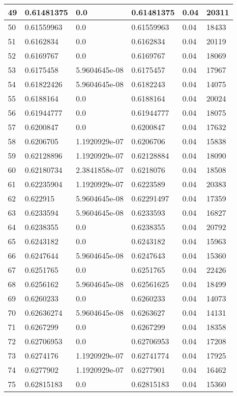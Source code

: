 \begin{longtable}{|l|l|l|l|l|l|}
49 & 0.61481375 & 0.0 & 0.61481375 & 0.04 & 20311 \\ \hline 
50 & 0.61559963 & 0.0 & 0.61559963 & 0.04 & 18433 \\ \hline 
51 & 0.6162834 & 0.0 & 0.6162834 & 0.04 & 20119 \\ \hline 
52 & 0.6169767 & 0.0 & 0.6169767 & 0.04 & 18069 \\ \hline 
53 & 0.6175458 & 5.9604645e-08 & 0.6175457 & 0.04 & 17967 \\ \hline 
54 & 0.61822426 & 5.9604645e-08 & 0.6182243 & 0.04 & 14075 \\ \hline 
55 & 0.6188164 & 0.0 & 0.6188164 & 0.04 & 20024 \\ \hline 
56 & 0.61944777 & 0.0 & 0.61944777 & 0.04 & 18075 \\ \hline 
57 & 0.6200847 & 0.0 & 0.6200847 & 0.04 & 17632 \\ \hline 
58 & 0.6206705 & 1.1920929e-07 & 0.6206706 & 0.04 & 15838 \\ \hline 
59 & 0.62128896 & 1.1920929e-07 & 0.62128884 & 0.04 & 18090 \\ \hline 
60 & 0.62180734 & 2.3841858e-07 & 0.6218076 & 0.04 & 18508 \\ \hline 
61 & 0.62235904 & 1.1920929e-07 & 0.6223589 & 0.04 & 20383 \\ \hline 
62 & 0.622915 & 5.9604645e-08 & 0.62291497 & 0.04 & 17359 \\ \hline 
63 & 0.6233594 & 5.9604645e-08 & 0.6233593 & 0.04 & 16827 \\ \hline 
64 & 0.6238355 & 0.0 & 0.6238355 & 0.04 & 20792 \\ \hline 
65 & 0.6243182 & 0.0 & 0.6243182 & 0.04 & 15963 \\ \hline 
66 & 0.6247644 & 5.9604645e-08 & 0.6247643 & 0.04 & 15360 \\ \hline 
67 & 0.6251765 & 0.0 & 0.6251765 & 0.04 & 22426 \\ \hline 
68 & 0.6256162 & 5.9604645e-08 & 0.62561625 & 0.04 & 18499 \\ \hline 
69 & 0.6260233 & 0.0 & 0.6260233 & 0.04 & 14073 \\ \hline 
70 & 0.62636274 & 5.9604645e-08 & 0.6263627 & 0.04 & 14131 \\ \hline 
71 & 0.6267299 & 0.0 & 0.6267299 & 0.04 & 18358 \\ \hline 
72 & 0.62706953 & 0.0 & 0.62706953 & 0.04 & 17208 \\ \hline 
73 & 0.6274176 & 1.1920929e-07 & 0.62741774 & 0.04 & 17925 \\ \hline 
74 & 0.6277902 & 1.1920929e-07 & 0.6277901 & 0.04 & 16462 \\ \hline 
75 & 0.62815183 & 0.0 & 0.62815183 & 0.04 & 15360 \\ \hline 
\end{longtable}